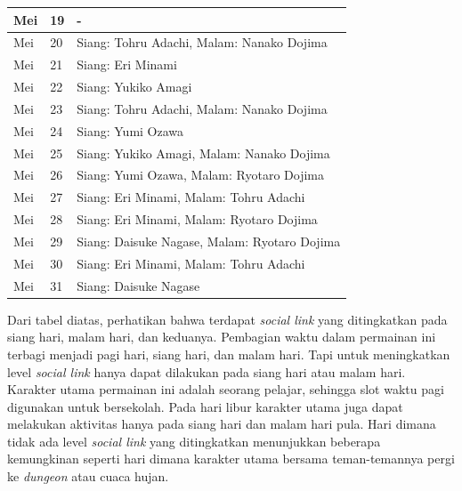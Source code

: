 \begin{table}[H]
\begin{center}
\begin{tabular}{ | p{} | p{} | p{} |}
            \hline
            Mei            & 19            & -                                               \\
            \hline
            Mei            & 20            & Siang: Tohru Adachi, Malam: Nanako Dojima       \\
            \hline
            Mei            & 21            & Siang: Eri Minami                               \\
            \hline
            Mei            & 22            & Siang: Yukiko Amagi                             \\
            \hline
            Mei            & 23            & Siang: Tohru Adachi, Malam: Nanako Dojima       \\
            \hline
            Mei            & 24            & Siang: Yumi Ozawa                               \\
            \hline
            Mei            & 25            & Siang: Yukiko Amagi, Malam: Nanako Dojima       \\
            \hline
            Mei            & 26            & Siang: Yumi Ozawa, Malam: Ryotaro Dojima        \\
            \hline
            Mei            & 27            & Siang: Eri Minami, Malam: Tohru Adachi          \\
            \hline
            Mei            & 28            & Siang: Eri Minami, Malam: Ryotaro Dojima        \\
            \hline
            Mei            & 29            & Siang: Daisuke Nagase, Malam: Ryotaro Dojima    \\
            \hline
            Mei            & 30            & Siang: Eri Minami, Malam: Tohru Adachi          \\
            \hline
            Mei            & 31            & Siang: Daisuke Nagase                           \\
            \hline
        \end{tabular}
    \end{center}

\end{table}

Dari tabel diatas, perhatikan bahwa terdapat \textit{social link} yang ditingkatkan pada siang hari, malam hari, dan keduanya. Pembagian waktu dalam permainan ini terbagi menjadi pagi hari, siang hari, dan malam hari. Tapi untuk meningkatkan level \textit{social link} hanya dapat dilakukan pada siang hari atau malam hari. Karakter utama permainan ini adalah seorang pelajar, sehingga slot waktu pagi digunakan untuk bersekolah. Pada hari libur karakter utama juga dapat melakukan aktivitas hanya pada siang hari dan malam hari pula. Hari dimana tidak ada level \textit{social link} yang ditingkatkan menunjukkan beberapa kemungkinan seperti hari dimana karakter utama bersama teman-temannya pergi ke \textit{dungeon} atau cuaca hujan.

